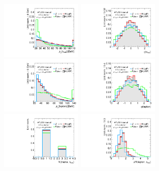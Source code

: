\clearpage
\begin{figure}[tp]
  \centering
  \includegraphics[width=0.35\textwidth]{figures/overlaid/boost/tau-pt}
  \includegraphics[width=0.35\textwidth]{figures/overlaid/boost/tau-eta}
  \includegraphics[width=0.35\textwidth]{figures/overlaid/boost/lep-pt-hi}
  \includegraphics[width=0.35\textwidth]{figures/overlaid/boost/lep-eta}
  \includegraphics[width=0.35\textwidth]{figures/overlaid/boost/tau-numTrack}
  \includegraphics[width=0.35\textwidth]{figures/overlaid/boost/taulep-dR}

\end{figure}
